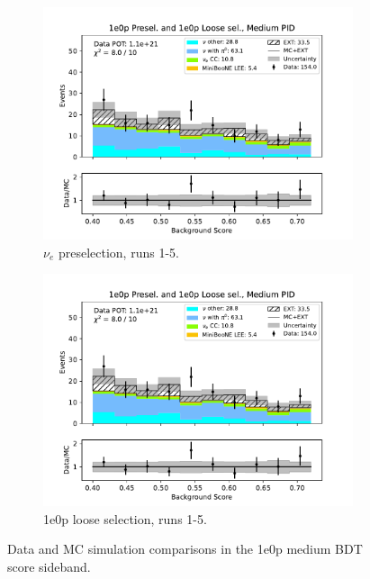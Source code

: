 \begin{figure}[H]
\begin{subfigure}{0.5\linewidth}
        \includegraphics[width=\linewidth]{technote/Sidebands/Figures/NearSideband/near_sideband_bkg_score_run1234b4c4d5_ZP_ZPLOOSESEL_MEDIUM_PID.pdf}
        \caption{$\nu_e$ preselection, runs 1-5.}
    \end{subfigure}%
    \begin{subfigure}{0.5\linewidth}
        \includegraphics[width=\linewidth]{technote/Sidebands/Figures/NearSideband/near_sideband_bkg_score_run1234b4c4d5_ZP_ZPLOOSESEL_MEDIUM_PID.pdf}
        \caption{1e0p loose selection, runs 1-5.}
    \end{subfigure}
    \caption{Data and MC simulation comparisons in the 1e0p medium BDT score sideband.}
\end{figure}